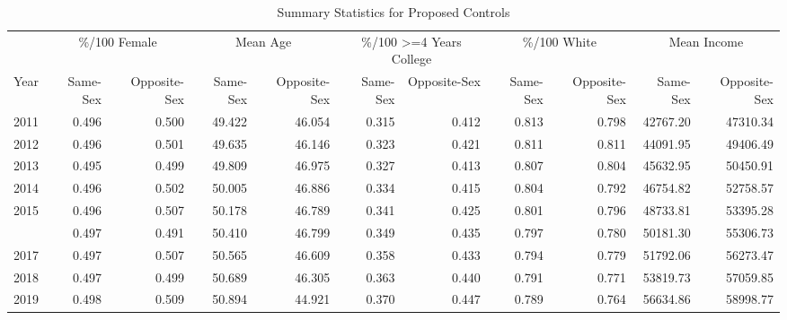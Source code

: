 \begin{table}

\caption{Summary Statistics for Proposed Controls}
\centering
\begin{tabular}[t]{rrrrrrrrrrr}
\toprule
\multicolumn{1}{c}{ } & \multicolumn{2}{c}{\%/100 Female} & \multicolumn{2}{c}{Mean Age} & \multicolumn{2}{c}{\%/100 >=4 Years College} & \multicolumn{2}{c}{\%/100 White} & \multicolumn{2}{c}{Mean Income} \\
\cmidrule(l{3pt}r{3pt}){2-3} \cmidrule(l{3pt}r{3pt}){4-5} \cmidrule(l{3pt}r{3pt}){6-7} \cmidrule(l{3pt}r{3pt}){8-9} \cmidrule(l{3pt}r{3pt}){10-11}
Year & Same-Sex & Opposite-Sex & Same-Sex & Opposite-Sex & Same-Sex & Opposite-Sex & Same-Sex & Opposite-Sex & Same-Sex & Opposite-Sex\\
\midrule
2011 & 0.496 & 0.500 & 49.422 & 46.054 & 0.315 & 0.412 & 0.813 & 0.798 & 42767.20 & 47310.34\\
2012 & 0.496 & 0.501 & 49.635 & 46.146 & 0.323 & 0.421 & 0.811 & 0.811 & 44091.95 & 49406.49\\
2013 & 0.495 & 0.499 & 49.809 & 46.975 & 0.327 & 0.413 & 0.807 & 0.804 & 45632.95 & 50450.91\\
2014 & 0.496 & 0.502 & 50.005 & 46.886 & 0.334 & 0.415 & 0.804 & 0.792 & 46754.82 & 52758.57\\
2015 & 0.496 & 0.507 & 50.178 & 46.789 & 0.341 & 0.425 & 0.801 & 0.796 & 48733.81 & 53395.28\\
\addlinespace
2016 & 0.497 & 0.491 & 50.410 & 46.799 & 0.349 & 0.435 & 0.797 & 0.780 & 50181.30 & 55306.73\\
2017 & 0.497 & 0.507 & 50.565 & 46.609 & 0.358 & 0.433 & 0.794 & 0.779 & 51792.06 & 56273.47\\
2018 & 0.497 & 0.499 & 50.689 & 46.305 & 0.363 & 0.440 & 0.791 & 0.771 & 53819.73 & 57059.85\\
2019 & 0.498 & 0.509 & 50.894 & 44.921 & 0.370 & 0.447 & 0.789 & 0.764 & 56634.86 & 58998.77\\
\bottomrule
\end{tabular}
\end{table}
